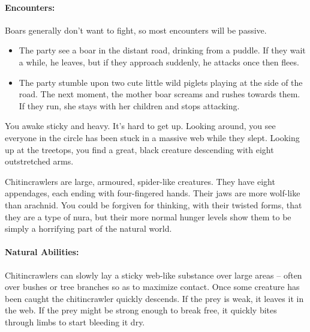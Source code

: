 \begin{multicols}{2}
\paragraph{Encounters:} Boars generally don't want to fight, so most encounters will be passive.

\begin{itemize}

  \item
  The party see a boar in the distant road, drinking from a puddle.
  If they wait a while, he leaves, but if they approach suddenly, he attacks once then flees.
  \item
  The party stumble upon two cute little wild piglets playing at the side of the road.
  The next moment, the mother boar screams and rushes towards them.
  If they run, she stays with her children and stops attacking.

\end{itemize}


\label{chitincrawler}

\begin{boxtext}

You awake sticky and heavy.
It's hard to get up.
Looking around, you see everyone in the circle has been stuck in a massive web while they slept.
Looking up at the treetops, you find a great, black creature descending with eight outstretched arms.

\end{boxtext}

Chitincrawlers are large, armoured, spider-like creatures.
They have eight appendages, each ending with four-fingered hands.
Their jaws are more wolf-like than arachnid.
You could be forgiven for thinking, with their twisted forms, that they are a type of nura, but their more normal hunger levels show them to be simply a horrifying part of the natural world.

\chitincrawler

\paragraph{Natural Abilities:} Chitincrawlers can slowly lay a sticky web-like substance over large areas -- often over bushes or tree branches so as to maximize contact.
Once some creature has been caught the chitincrawler quickly descends.
If the prey is weak, it leaves it in the web.
If the prey might be strong enough to break free, it quickly bites through limbs to start bleeding it dry.


\end{multicols}
